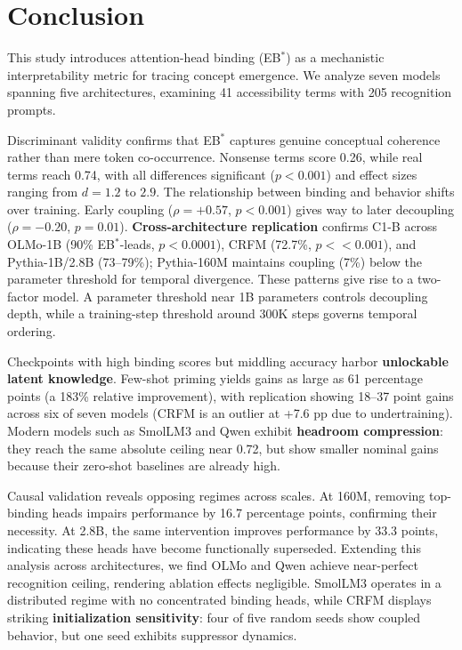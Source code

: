 \documentclass[10pt]{article} %
\begin{document}
\section{Conclusion}

This study introduces attention-head binding (EB$^*$) as a mechanistic interpretability metric for tracing concept emergence. We analyze seven models spanning five architectures, examining 41 accessibility terms with 205 recognition prompts.

Discriminant validity confirms that EB$^*$ captures genuine conceptual coherence rather than mere token co-occurrence. Nonsense terms score 0.26, while real terms reach 0.74, with all differences significant ($p<0.001$) and effect sizes ranging from $d=1.2$ to $2.9$.
The relationship between binding and behavior shifts over training. Early coupling ($\rho=+0.57$, $p<0.001$) gives way to later decoupling ($\rho=-0.20$, $p=0.01$).
\textbf{Cross-architecture replication} confirms C1-B across OLMo-1B (90\% EB$^*$-leads, $p<0.0001$), CRFM (72.7\%, $p<<0.001$), and Pythia-1B/2.8B (73--79\%); Pythia-160M maintains coupling (7\%) below the parameter threshold for temporal divergence.
These patterns give rise to a two-factor model. A parameter threshold near 1B parameters controls decoupling depth, while a training-step threshold around 300K steps governs temporal ordering.

Checkpoints with high binding scores but middling accuracy harbor \textbf{unlockable latent knowledge}. Few-shot priming yields gains as large as 61 percentage points (a 183\% relative improvement), with replication showing 18--37 point gains across six of seven models (CRFM is an outlier at +7.6 pp due to undertraining). Modern models such as SmolLM3 and Qwen exhibit \textbf{headroom compression}: they reach the same absolute ceiling near 0.72, but show smaller nominal gains because their zero-shot baselines are already high.

Causal validation reveals opposing regimes across scales. At 160M, removing top-binding heads impairs performance by 16.7 percentage points, confirming their necessity. At 2.8B, the same intervention improves performance by 33.3 points, indicating these heads have become functionally superseded. Extending this analysis across architectures, we find OLMo and Qwen achieve near-perfect recognition ceiling, rendering ablation effects negligible. SmolLM3 operates in a distributed regime with no concentrated binding heads, while CRFM displays striking \textbf{initialization sensitivity}: four of five random seeds show coupled behavior, but one seed exhibits suppressor dynamics.
\end{document}
